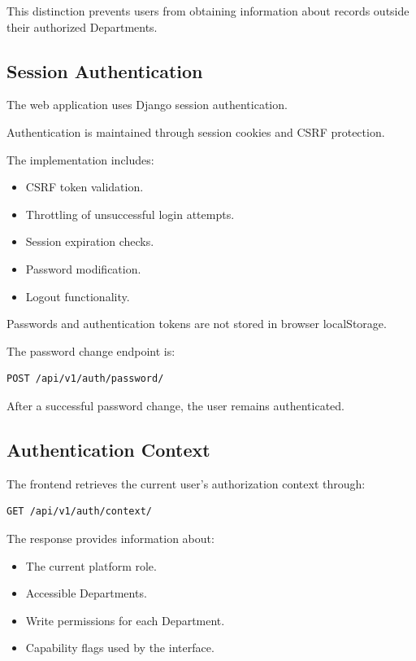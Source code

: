 \documentclass[11pt,a4paper]{article}
\begin{document}
This distinction prevents users from obtaining
information about records outside their
authorized Departments.

\subsection{Session Authentication}

The web application uses Django session
authentication.

Authentication is maintained through
session cookies and CSRF protection.

The implementation includes:

\begin{itemize}
    \item CSRF token validation.
    \item Throttling of unsuccessful login attempts.
    \item Session expiration checks.
    \item Password modification.
    \item Logout functionality.
\end{itemize}

Passwords and authentication tokens are not
stored in browser localStorage.

The password change endpoint is:

\begin{lstlisting}
POST /api/v1/auth/password/
\end{lstlisting}

After a successful password change,
the user remains authenticated.

\subsection{Authentication Context}

The frontend retrieves the current user's
authorization context through:

\begin{lstlisting}
GET /api/v1/auth/context/
\end{lstlisting}

The response provides information about:

\begin{itemize}
    \item The current platform role.
    \item Accessible Departments.
    \item Write permissions for each Department.
    \item Capability flags used by the interface.
\end{itemize}
\end{document}
